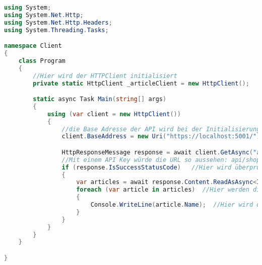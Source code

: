 \documentclass[a4paper,12pt]{report}
\begin{document}
\begin{lstlisting}[language=csharp, caption=Beispiel für einen API-Controller in C\#]
using System;
using System.Net.Http;
using System.Net.Http.Headers;
using System.Threading.Tasks;

namespace Client
{
    class Program 
    {
        //Hier wird der HTTPClient initialisiert
        private static HttpClient _articleClient = new HttpClient();

        static async Task Main(string[] args)
        {
            using (var client = new HttpClient())
            {
                //die Base Adresse der API wird bei der Initialisierung des HTTPClient angegeben und wird bei jeder Anfrage verwendet
                client.BaseAddress = new Uri("https://localhost:5001/");

                HttpResponseMessage response = await client.GetAsync("api/shop/articles");
                //Mit einem API Key würde die URL so aussehen: api/shop/articles?apiKey=1234
                if (response.IsSuccessStatusCode)   //Hier wird überprüft ob die Anfrage erfolgreich war
                {
                    var articles = await response.Content.ReadAsAsync<IEnumerable<Article>>();  //Hier werden die Daten in eine Liste von Artikeln umgewandelt
                    foreach (var article in articles)  //Hier werden die Daten durchgegangen
                    {
                        Console.WriteLine(article.Name);  //Hier wird der Name des Artikels ausgegeben
                    }
                }
            }
        }
    }

}
\end{lstlisting}
\end{document}
